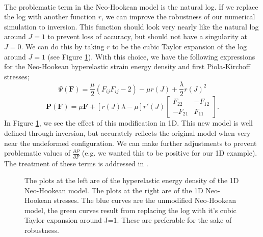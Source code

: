 \\
The problematic term in the Neo-Hookean model is the natural log. If we replace the log with another function $r$, we can improve the robustness of our numerical simulation to inversion. This function should look very nearly like the natural log around $J=1$ to prevent loss of accuracy, but should not have a singularity at $J=0$. We can do this by taking $r$ to be the cubic Taylor expansion of the log around $J=1$ (see Figure \ref{inversion3}). With this choice, we have the following expressions for the Neo-Hookean hyperelastic strain energy density and first Piola-Kirchoff stresses;
$$
\Psi(\mathbf{F})=\frac{\mu}{2}(F_{ij}F_{ij}-2)-\mu{r}(J)+\frac{\lambda}{2}r(J)^2
$$
$$
\mathbf{P}(\mathbf{F})=\mu\mathbf{F}+\left[r(J)\lambda-\mu\right]r'(J)\left[\begin{array}{cc}
F_{22} & -F_{12}\\
-F_{21} & F_{11} \end{array}\right].
$$
In Figure \ref{inversion3}, we see the effect of this modification in 1D. This new model is well defined through inversion, but accurately reflects the original model when very near the undeformed configuration. We can make further adjustments to prevent problematic values of $\frac{\partial{P}}{\partial{F}}$ (e.g. we wanted this to be positive for our 1D example). The treatment of these terms is addressed in \cite{TeranQuas05}.
\begin{figure}
\caption{The plots at the left are of the hyperelastic energy density of the 1D Neo-Hookean model. The plots at the right are of the 1D Neo-Hookean stresses. The blue curves are the unmodified Neo-Hookean model, the green curves result from replacing the log with it's cubic Taylor expansion around J=1. These are preferable for the sake of robustness.}
\label{inversion3}
\end{figure}

